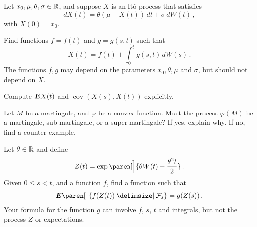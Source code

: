 \begin{problem}
  Let $x_0, \mu, \theta, \sigma \in \mathbb{R}$, and suppose $X$ is an It\^o process that satisfies
  \begin{equation*}
    dX(t) = \theta( \mu - X(t)) \, dt + \sigma \, dW(t)\,,
  \end{equation*}
  with $X(0) = x_0$.
  \begin{parts}
    \item 
      Find functions $f = f(t)$ and $g = g(s, t)$ such that
      \begin{equation*}
	X(t) = f(t) + \int_0^t g(s, t) \, dW(s)\,.
      \end{equation*}
      The functions $f, g$ may depend on the parameters $x_0, \theta, \mu$ and $\sigma$, but should not depend on $X$.
    \item
      Compute $\bm{E} X(t)$ and $\operatorname{cov}(X(s), X(t))$ explicitly.
  \end{parts}
\end{problem}

\begin{problem}
  Let $M$ be a martingale, and $\varphi$ be a convex function.
  Must the process $\varphi(M)$ be a martingale, sub-martingale, or a super-martingale?
  If yes, explain why.
  If no, find a counter example.
\end{problem}

\begin{problem}
  Let $\theta \in \mathbb{R}$ and define
  \begin{equation*}
    Z(t) = \exp\paren[\Big]{ \theta W(t) - \frac{\theta^2 t}{2}}\,.
  \end{equation*}
  Given $0 \leq s < t$, and a function $f$, find a function such that
  \begin{equation*}
    \E\paren[\big]{ f(Z(t)) \given \mathcal F_s } = g(Z(s))\,.
  \end{equation*}
  Your formula for the function $g$ can involve $f$, $s$, $t$ and integrals, but not the process $Z$ or expectations.
\end{problem}

